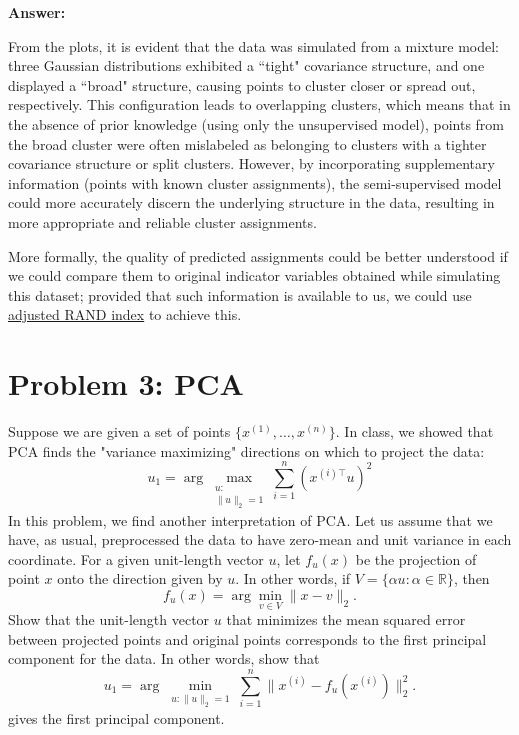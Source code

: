 \documentclass{article}
\begin{document}
\begin{enumerate}[label=(\alph*)]
\textbf{Answer:}

From the plots, it is evident that the data was simulated from a mixture model: three Gaussian distributions exhibited a ``tight" covariance structure, and one displayed a ``broad" structure, causing points to cluster closer or spread out, respectively. This configuration leads to overlapping clusters, which means that in the absence of prior knowledge (using only the unsupervised model), points from the broad cluster were often mislabeled as belonging to clusters with a tighter covariance structure or split clusters.  However, by incorporating supplementary information (points with known cluster assignments), the semi-supervised model could more accurately discern the underlying structure in the data, resulting in more appropriate and reliable cluster assignments.

More formally, the quality of predicted assignments could be better understood if we could compare them to original indicator variables obtained while simulating this dataset; provided that such information is available to us,  we could use \href{https://en.wikipedia.org/wiki/Rand_index}{adjusted RAND index} to achieve this.



\end{enumerate}



\section*{Problem 3: PCA}


Suppose we are given a set of points $\{x^{(1)},\ldots,x^{(n)}\}$. In class, we showed that PCA finds the "variance maximizing" directions on which to project the data:
\[
u_1 = \arg\max_{\substack{u:\\\|u\|_2=1}} \sum_{i=1}^{n} (x^{(i)\top} u)^2
\]
In this problem, we find another interpretation of PCA.
Let us assume that we have, as usual, preprocessed the data to have zero-mean and unit variance in each coordinate. For a given unit-length vector $u$, let $f_u(x)$ be the projection of point $x$ onto the direction given by $u$. In other words, if $V = \{\alpha u : \alpha \in \mathbb{R}\}$, then
\[
f_u(x) = \arg \min_{v \in V} \|x - v\|_2.
\]
Show that the unit-length vector $u$ that minimizes the mean squared error between projected points and original points corresponds to the first principal component for the data. In other words, show that
\[
u_1 = \arg \min_{\substack{u:\|u\|_2=1}} \sum_{i=1}^{n} \|x^{(i)} - f_u(x^{(i)})\|_2^2.
\]
gives the first principal component.
\end{document}
